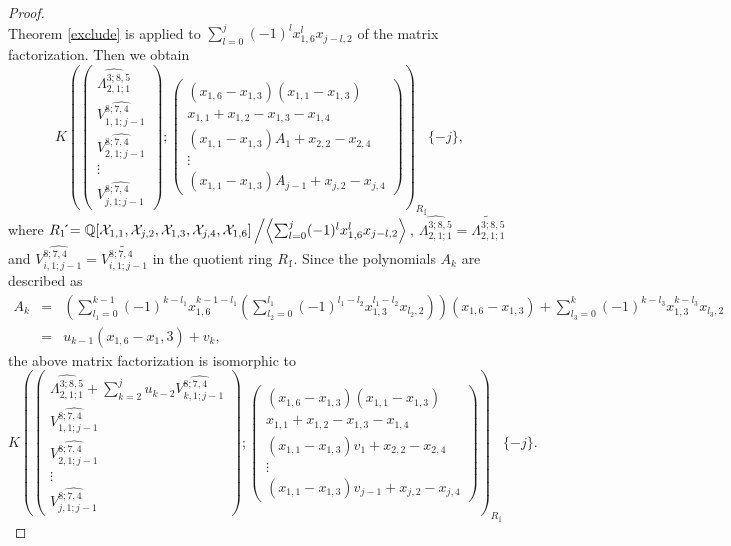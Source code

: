 \documentclass[10pt]{amsart}
\theoremstyle{break}
\begin{document}
\begin{proof}
\begin{equation*}
\end{equation*}
Theorem \ref{exclude} is applied to $\sum_{l=0}^{j}(-1)^lx_{1,6}^l x_{j-l,2}$ of the matrix factorization.
Then we obtain
\begin{equation*}
K\left(
\left( 
\begin{array}{c}
\widehat{\Lambda^{3;8,5}_{2,1;1}}\\[.5em]
\widehat{V^{8;7,4}_{1,1;j-1}}\\[.5em]
\widehat{V^{8;7,4}_{2,1;j-1}}\\[.5em]
\vdots\\[.5em]
\widehat{V^{8;7,4}_{j,1;j-1}}
\end{array}
\right);
\left(
\begin{array}{c}
(x_{1,6}-x_{1,3})(x_{1,1}-x_{1,3})\\[.9em]
x_{1,1}+x_{1,2}-x_{1,3}-x_{1,4}\\[.9em]
(x_{1,1}-x_{1,3})A_1+x_{2,2}-x_{2,4}\\[.9em]
\vdots\\[.9em]
(x_{1,1}-x_{1,3})A_{j-1}+x_{j,2}-x_{j,4}
\end{array}
\right)
\right)_{R_1\acute{}}\{-j\},
\end{equation*}
where $R_1\acute{}={{\mathbb{Q}}}[\mathcal{X}_{1,1},\mathcal{X}_{j,2},\mathcal{X}_{1,3},\mathcal{X}_{j,4},\mathcal{X}_{1,6}]\left/\left<\sum_{l=0}^{j}(-1)^lx_{1,6}^l x_{j-l,2}\right>\right.$, $\widehat{\Lambda^{3;8,5}_{2,1;1}}=\widetilde{\Lambda^{3;8,5}_{2,1;1}}$ and $\widehat{V^{8;7,4}_{i,1;j-1}}=\widetilde{V^{8;7,4}_{i,1;j-1}}$ in the quotient ring $R_1\acute{}$.
Since the polynomials $A_k$ are described as
\begin{eqnarray*}
A_k&=&\left(\sum_{l_1=0}^{k-1}(-1)^{k-l_1}x_{1,6}^{k-1-l_1}\left(\sum_{l_2=0}^{l_1}(-1)^{l_1-l_2}x_{1,3}^{l_1-l_2}x_{l_2,2}\right)\right)(x_{1,6}-x_{1,3})
+\sum_{l_3=0}^k (-1)^{k-l_3}x_{1,3}^{k-l_3}x_{l_3,2}\\
&=&u_{k-1}(x_{1,6}-x_1,3)+v_k,
\end{eqnarray*}
the above matrix factorization is isomorphic to
\begin{equation*}
K\left(
\left( 
\begin{array}{c}
\widehat{\Lambda^{3;8,5}_{2,1;1}}+\sum_{k=2}^{j}u_{k-2}\widehat{V^{8;7,4}_{k,1;j-1}}\\[.5em]
\widehat{V^{8;7,4}_{1,1;j-1}}\\[.5em]
\widehat{V^{8;7,4}_{2,1;j-1}}\\[.5em]
\vdots\\[.5em]
\widehat{V^{8;7,4}_{j,1;j-1}}
\end{array}
\right);
\left(
\begin{array}{c}
(x_{1,6}-x_{1,3})(x_{1,1}-x_{1,3})\\[.9em]
x_{1,1}+x_{1,2}-x_{1,3}-x_{1,4}\\[.9em]
(x_{1,1}-x_{1,3})v_1+x_{2,2}-x_{2,4}\\[.9em]
\vdots\\[.9em]
(x_{1,1}-x_{1,3})v_{j-1}+x_{j,2}-x_{j,4}
\end{array}
\right)
\right)_{R_1\acute{}}\{-j\}.
\end{equation*}


\end{proof}
\end{document}
